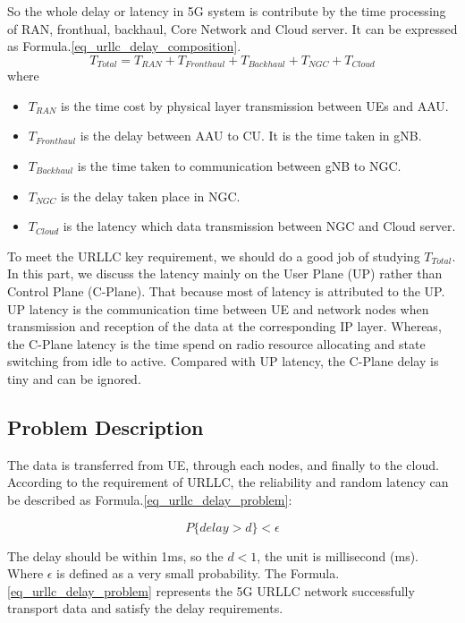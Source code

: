\documentclass[runningheads]{llncs}
\begin{document}
So the whole delay or latency in 5G system is contribute by the time processing of RAN, fronthual, backhaul, Core Network and Cloud server. It can be expressed as Formula.\ref{eq_urllc_delay_composition}.
\begin{equation}\label{eq_urllc_delay_composition}
T_{Total} = T_{RAN} + T_{Fronthaul} + T_{Backhaul} + T_{NGC} + T_{Cloud}
\end{equation}
where
\begin{itemize}
\item $T_{RAN}$ is the time cost by physical layer transmission between UEs and AAU.
\item $T_{Fronthaul}$ is the delay between AAU to CU. It is the time taken in gNB.
\item $T_{Backhaul}$ is the time taken to communication between gNB to NGC.
\item $T_{NGC}$ is the delay taken place in NGC.
\item $T_{Cloud}$ is the latency which data transmission between NGC and Cloud server.
\end{itemize}
To meet the URLLC key requirement, we should do a good job of studying $T_{Total}$.
In this part, we discuss the latency mainly on the User Plane (UP) rather than Control Plane (C-Plane).
That because most of latency is attributed to the UP.
UP latency is the communication time between UE and network nodes when transmission and reception of the data at the corresponding IP layer.
Whereas, the C-Plane latency is the time spend on radio resource allocating and state switching from idle to active.
Compared with UP latency, the C-Plane delay is tiny and can be ignored.
\subsection{Problem Description}
The data is transferred from UE, through each nodes, and finally to the cloud.
According to the requirement of URLLC, the reliability and random latency \cite{MF_Random} can be described as Formula.\ref{eq_urllc_delay_problem}:

\begin{equation}\label{eq_urllc_delay_problem}
P\{delay > d \} < \epsilon
\end{equation}

The delay should be within 1ms, so the $d < 1$, the unit is millisecond (ms).
Where $\epsilon$ is defined as a very small probability.
The Formula.\ref{eq_urllc_delay_problem} represents the 5G URLLC network successfully transport data and satisfy the delay requirements.
\end{document}
